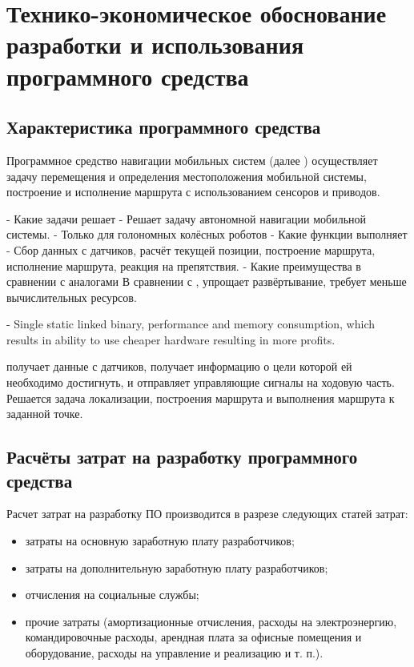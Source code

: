 \section{Технико-экономическое обоснование разработки и использования программного средства}

\subsection{Характеристика программного средства}

Программное средство навигации мобильных систем (далее \appname{} ) осуществляет задачу перемещения и определения местоположения мобильной системы, построение и исполнение маршрута с использованием сенсоров и приводов.

- Какие задачи решает
	- Решает задачу автономной навигации мобильной системы.
	- Только для голономных колёсных роботов
- Какие функции выполняет
	- Сбор данных с датчиков, расчёт текущей позиции, построение маршрута, исполнение маршрута, реакция на препятствия.
- Какие преимущества в сравнении с аналогами
	В сравнении с \ros{}, \appname{} упрощает развёртывание, требует меньше вычислительных ресурсов.


- Single static linked binary, performance and memory consumption, which results in ability to use cheaper hardware resulting in more profits.


\appname{} получает данные с датчиков, получает информацию о цели которой ей необходимо достигнуть, и отправляет управляющие сигналы на ходовую часть. Решается задача локализации, построения маршрута и выполнения маршрута к заданной точке. 

\subsection{Расчёты затрат на разработку программного средства}

Расчет затрат на разработку ПО производится в разрезе следующих статей затрат:

\begin{itemize}
	\item затраты на основную заработную плату разработчиков;
	\item затраты на дополнительную заработную плату разработчиков;
	\item отчисления на социальные службы;
	\item прочие затраты (амортизационные отчисления, расходы на электроэнергию, командировочные расходы, арендная плата за офисные помещения и оборудование, расходы на управление и реализацию и т. п.).
\end{itemize}

